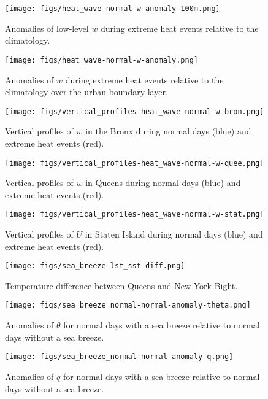 \documentclass[num-refs]{wiley-article}
\begin{document}
\begin{figure}[ht]
	\centering
	\texttt{[image: figs/heat\_wave-normal-w-anomaly-100m.png]}
	\caption{Anomalies of low-level $w$ during extreme heat events relative to the climatology.}
	\label{fig:extreme-heat-normal-comparison-100m-w}
\end{figure}
\begin{figure}[ht]
	\centering
	\texttt{[image: figs/heat\_wave-normal-w-anomaly.png]}
	\caption{Anomalies of $w$ during extreme heat events relative to the climatology over the urban boundary layer.}
	\label{fig:extreme-heat-normal-comparison-contours-w}
\end{figure}
\begin{figure}[ht]
	\centering
	\texttt{[image: figs/vertical\_profiles-heat\_wave-normal-w-bron.png]}
	\caption{Vertical profiles of $w$ in the Bronx during normal days (blue) and extreme heat events (red).}
	\label{fig:extreme-heat-normal-vertical_profiles-w-bron}
\end{figure}
\begin{figure}[ht]
	\centering
	\texttt{[image: figs/vertical\_profiles-heat\_wave-normal-w-quee.png]}
	\caption{Vertical profiles of $w$ in Queens during normal days (blue) and extreme heat events (red).}
	\label{fig:extreme-heat-normal-vertical_profiles-w-quee}
\end{figure}

\begin{figure}[ht]
	\centering
	\texttt{[image: figs/vertical\_profiles-heat\_wave-normal-w-stat.png]}
	\caption{Vertical profiles of $U$ in Staten Island during normal days (blue) and extreme heat events (red).}
	\label{fig:extreme-heat-normal-vertical_profiles-w-stat}
\end{figure}

\begin{figure}[ht]
	\centering
	\texttt{[image: figs/sea\_breeze-lst\_sst-diff.png]}
	\caption{Temperature difference between Queens and New York Bight.}
	\label{fig:sea_breeze-lst_sst-diff}
\end{figure}

\begin{figure}[ht]
	\centering
	\texttt{[image: figs/sea\_breeze\_normal-normal-anomaly-theta.png]}
	\caption{Anomalies of $\theta$ for normal days with a sea breeze relative to normal days without a sea breeze.}
	\label{fig:sea_breeze_normal-normal-anomaly-theta}
\end{figure}
\begin{figure}[ht]
	\centering
	\texttt{[image: figs/sea\_breeze\_normal-normal-anomaly-q.png]}
	\caption{Anomalies of $q$ for normal days with a sea breeze relative to normal days without a sea breeze.}
	\label{fig:sea_breeze_normal-normal-anomaly-q}
\end{figure}
\end{document}
